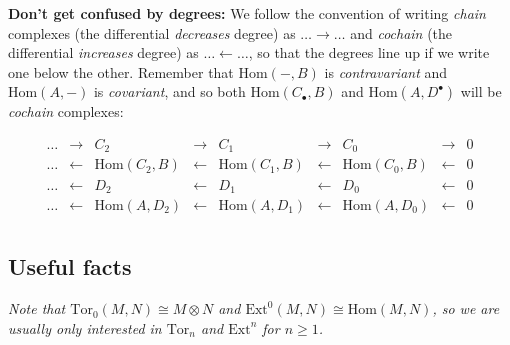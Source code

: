 \documentclass[10pt]{article}
\begin{document}
            \textbf{Don't get confused by degrees:} We follow the convention of
            writing \emph{chain} complexes (the differential \emph{decreases}
            degree) as $\ldots\to\ldots$ and \emph{cochain} (the differential
            \emph{increases} degree) as $\ldots\leftarrow\ldots$, so that the
            degrees line up if we write one below the other. Remember that
            $\mathrm{Hom}(-,B)$ is \emph{contravariant} and $\mathrm{Hom}(A,-)$
            is \emph{covariant}, and so both $\mathrm{Hom}(C_\bullet, B)$ and
            $\mathrm{Hom}(A,D^\bullet)$ will be \emph{cochain} complexes:

            \begin{equation*}
                \begin{array}{ccccccccc}
                    \ldots & \to & C_2 & \to & C_1 & \to & C_0 & \to & 0\\
                    \ldots & \leftarrow & \mathrm{Hom}(C_2,B) & \leftarrow & \mathrm{Hom}(C_1,B) & \leftarrow & \mathrm{Hom}(C_0,B) & \leftarrow & 0\\[1em]
                    \ldots & \leftarrow & D_2 & \leftarrow & D_1 & \leftarrow & D_0 & \leftarrow & 0\\
                    \ldots & \leftarrow & \mathrm{Hom}(A,D_2) & \leftarrow & \mathrm{Hom}(A,D_1) & \leftarrow & \mathrm{Hom}(A,D_0) & \leftarrow & 0\\
                \end{array}
            \end{equation*}

        \subsection{Useful facts}

            \emph{Note that $\mathrm{Tor}_0(M,N)\cong M\otimes N$ and
            $\mathrm{Ext}^0(M,N)\cong\mathrm{Hom}(M,N)$, so we are usually only
            interested in $\mathrm{Tor}_n$ and $\mathrm{Ext}^n$ for
            $n\geqslant1$.}
\end{document}
